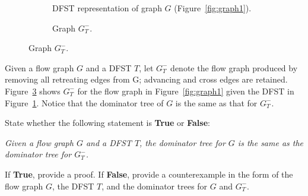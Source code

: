 \documentclass[12pt]{article}
\begin{document}
\begin{enumerate}
\begin{figure}[h]
\begin{subfigure}[b]{0.50\linewidth}
    \caption{DFST representation of graph $G$ (Figure~\ref{fig:graph1}).}
    \label{fig:dfst1}
    \end{subfigure}
    \begin{subfigure}[b]{0.40\linewidth}
      \centering
  
    \caption{Graph $G_T^-$. }
    \label{fig:graphminus}
    \end{subfigure}
  \end{figure}
  Given a flow graph $G$ and a DFST $T$, let $G_T^-$ denote the flow graph
  produced by removing all retreating edges from G; advancing and cross
  edges are retained. Figure~\ref{fig:graphminus} shows $G_T^-$ for the flow
  graph in Figure~\ref{fig:graph1} given the DFST in Figure~\ref{fig:dfst1}.
  Notice that the dominator tree of $G$ is the same as that for $G_T^-$.

  State whether the following statement is \textbf{True} or \textbf{False}: 

  \emph{Given a flow graph $G$ and a DFST $T$, the dominator tree for $G$ is
  the same as the dominator tree for $G_T^-$.}

  If \textbf{True}, provide a proof.
  If \textbf{False}, provide a counterexample in the form of the flow graph $G$, the DFST $T$, and the dominator trees for $G$  and $G_T^-$.


\end{enumerate}
\end{document}
